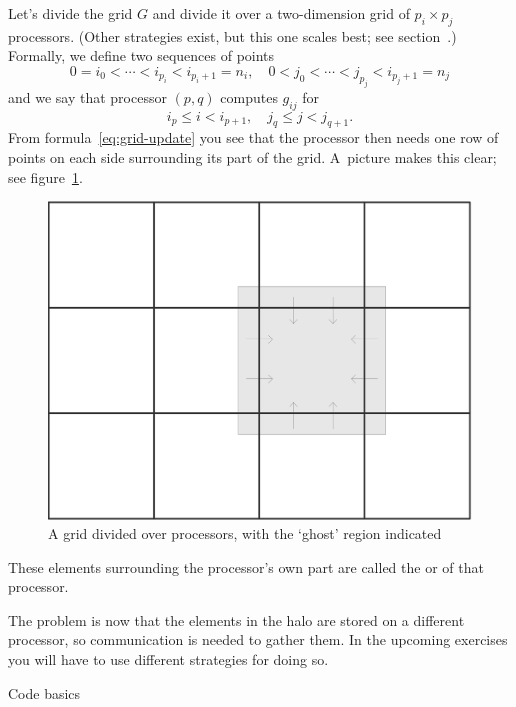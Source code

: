Let's divide the grid $G$ and divide it over a two-dimension grid of
$p_i\times p_j$
processors. (Other strategies exist, but this one scales best; see
section~.)
Formally, we define two sequences of points
\[ 0=i_0<\cdots<i_{p_i}<i_{p_i+1}=n_i,\quad 
   0<j_0<\cdots<j_{p_j}<i_{p_j+1}=n_j
\]
and we say that processor $(p,q)$ computes $g_{ij}$ for
\[ i_p\leq i<i_{p+1}, \quad j_q\leq j<j_{q+1}.
\]
From formula~\eqref{eq:grid-update} you see that the processor then
needs one row of points on each side surrounding its part of the
grid. A~picture makes this clear; see figure~\ref{fig:ghost-grid}.
\begin{figure}
\includegraphics[scale=.1]{graphics-public/jacobi-average}
\caption{A grid divided over processors, with the `ghost' region indicated}
\label{fig:ghost-grid}
\end{figure}
These elements surrounding the processor's own part are called
the  or  of that processor.

The problem is now that the elements in the halo are stored on a
different processor, so communication is needed to gather them. In the
upcoming exercises you will have to use different strategies for doing
so.

 {Code basics}

